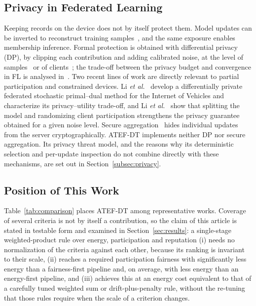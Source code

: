 \subsection{Privacy in Federated Learning}
\begin{revblock}Keeping records on the device does not by itself protect them. Model updates can be inverted to reconstruct training samples~\cite{zhu2019deep}, and the same exposure enables membership inference. Formal protection is obtained with differential privacy (DP), by clipping each contribution and adding calibrated noise, at the level of samples~\cite{abadi2016deep} or of clients~\cite{wei2020federated}; the trade-off between the privacy budget and convergence in FL is analysed in~\cite{wei2020federated}. Two recent lines of work are directly relevant to partial participation and constrained devices. Li \emph{et al.}~\cite{li2025differentially} develop a differentially private federated stochastic primal--dual method for the Internet of Vehicles and characterize its privacy--utility trade-off, and Li \emph{et al.}~\cite{li2025federated} show that splitting the model and randomizing client participation strengthens the privacy guarantee obtained for a given noise level. Secure aggregation~\cite{bonawitz2017practical} hides individual updates from the server cryptographically. ATEF-DT implements neither DP nor secure aggregation. Its privacy threat model, and the reasons why its deterministic selection and per-update inspection do not combine directly with these mechanisms, are set out in Section~\ref{subsec:privacy}.\end{revblock}

\subsection{Position of This Work}
\label{subsec:position}
\begin{revblock}Table~\ref{tab:comparison} places ATEF-DT among representative works. Coverage of several criteria is not by itself a contribution, so the claim of this article is stated in testable form and examined in Section~\ref{sec:results}: a single-stage weighted-product rule over energy, participation and reputation (i) needs no normalization of the criteria against each other, because its ranking is invariant to their scale, (ii) reaches a required participation fairness with significantly less energy than a fairness-first pipeline and, on average, with less energy than an energy-first pipeline, and (iii) achieves this at an energy cost equivalent to that of a carefully tuned weighted sum or drift-plus-penalty rule, without the re-tuning that those rules require when the scale of a criterion changes.\end{revblock}

